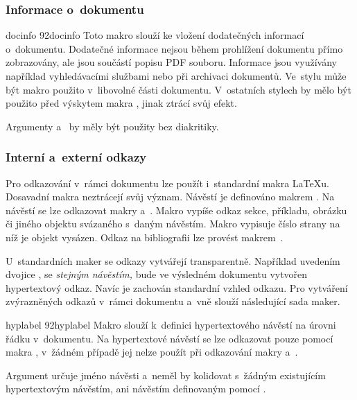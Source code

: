 \documentclass[12pt]{article}
\begin{document}
\subsubsection*{Informace o~dokumentu}

\begin{makro}{docinfo}
  {\char92docinfo}
  Toto makro slouží ke vložení dodatečných informací o~dokumentu. 
  Dodatečné informace nejsou během prohlížení dokumentu přímo zobrazovány,
  ale jsou součástí popisu PDF souboru. Informace jsou využívány například
  vyhledávacími službami nebo při archivaci dokumentů. 
  Ve~stylu  může být makro  použito v~libovolné
  části dokumentu. V~ostatních stylech by mělo být použito před výskytem makra
  , jinak ztrácí svůj efekt.

  \smallskip
  Argumenty  a~ by měly být použity bez diakritiky.

  \begin{example}
  \end{example}
\end{makro}

\subsubsection*{Interní a~externí odkazy}
Pro odkazování v~rámci dokumentu lze použít i~standardní makra \LaTeX u.
Dosavadní makra neztrácejí svůj význam.
Návěstí je definováno makrem . 
Na návěstí se lze odkazovat makry  a~. Makro
 vypíše odkaz sekce, příkladu, obrázku či jiného objektu
svázaného s~daným návěstím. Makro  vypisuje číslo strany
na níž je objekt vysázen. Odkaz na bibliografii lze provést 
makrem~.

\medskip
U~standardních maker se odkazy vytvářejí transparentně. Například uvedením
dvojice ,  se \emph{stejným návěstím,}
bude ve výsledném dokumentu vytvořen hypertextový odkaz. 
Navíc je zachován standardní vzhled odkazu.
Pro vytváření zvýrazněných odkazů 
v~rámci dokumentu a~vně slouží následující sada maker.

\medskip
\begin{makro}{hyplabel}
  {\char92hyplabel}
  Makro slouží k~definici hypertextového návěstí na úrovni řádku v~dokumentu.
  Na hypertextové návěstí se lze odkazovat pouze pomocí makra ,
  v~žádném případě jej nelze použít při odkazování makry 
  a~.

  \smallskip
  Argument  určuje jméno návěsti a~neměl by kolidovat s~žádným
  existujícím hypertextovým návěstím, ani návěstím definovaným pomocí
  .
  
  \begin{example}
  \end{example}
\end{makro}
\end{document}
